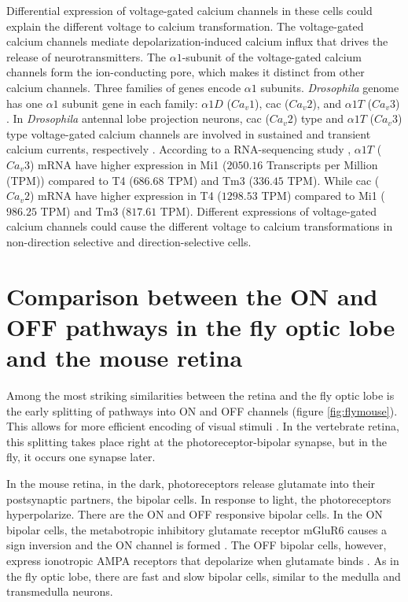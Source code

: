 Differential expression of voltage-gated calcium channels in these cells could explain the different voltage to calcium transformation. The voltage-gated calcium channels mediate depolarization-induced calcium influx that drives the release of neurotransmitters. The $\alpha1$-subunit of the voltage-gated calcium channels form the ion-conducting pore, which makes it distinct from other calcium channels. Three families of genes encode $\alpha1$ subunits. \textit{Drosophila} genome has one $\alpha1$ subunit gene in each family: $\alpha1D$ ($Ca_{v}1$), cac ($Ca_{v}2$), and $\alpha1T$ ($Ca_{v}3$) \parencite{Littleton2000, King2007}. In \textit{Drosophila} antennal lobe projection neurons, cac ($Ca_{v}2$) type and $\alpha1T$ ($Ca_{v}3$) type voltage-gated calcium channels are involved in sustained and transient calcium currents, respectively \parencite{Gu2009, Iniguez2013}. According to a RNA-sequencing study \parencite{Davis2020}, $\alpha1T$ ($Ca_{v}3$) mRNA have higher expression in Mi1 ($2050.16$ Transcripts per Million (TPM)) compared to T4 ($686.68$ TPM) and Tm3 ($336.45$ TPM). While cac ($Ca_{v}2$) mRNA have higher expression in T4 ($1298.53$ TPM) compared to Mi1 ($986.25$ TPM) and Tm3 ($817.61$ TPM). Different expressions of voltage-gated calcium channels could cause the different voltage to calcium transformations in non-direction selective and direction-selective cells.

\section{Comparison between the ON and OFF pathways in the fly optic lobe and the mouse retina}
Among the most striking similarities between the retina and the fly optic lobe is the early splitting of pathways into ON and OFF channels (figure \ref{fig:flymouse}). This allows for more efficient encoding of visual stimuli \parencite{Gjorgjieva2014}. In the vertebrate retina, this splitting takes place right at the photoreceptor-bipolar synapse, but in the fly, it occurs one synapse later.

In the mouse retina, in the dark, photoreceptors release glutamate into their postsynaptic partners, the bipolar cells. In response to light, the photoreceptors hyperpolarize. There are the ON and OFF responsive bipolar cells. In the ON bipolar cells, the metabotropic inhibitory glutamate receptor mGluR6 causes a sign inversion and the ON channel is formed \parencite{Masu1995}. The OFF bipolar cells, however, express ionotropic AMPA receptors that depolarize when glutamate binds \parencite{Euler2014}. As in the fly optic lobe, there are fast and slow bipolar cells, similar to the medulla and transmedulla neurons.

